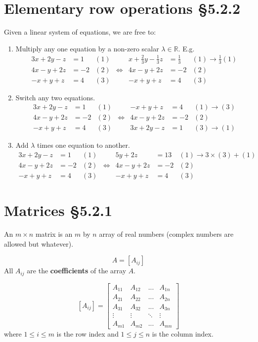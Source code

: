 \documentclass[11pt]{article}
\newcommand{\reals}{\mathbb{R}}
\begin{document}
\section{Elementary row operations §5.2.2}
Given a linear system of equations, we are free to:
\begin{enumerate}[ (1) ]
\item Multiply any one equation by a non-zero scalar $\lambda \in \reals$.
E.g.
\begin{align*}
3x + 2y - z &= 1 & (1) & & x + \frac{2}{3}y - \frac{1}{3}z &= \frac{1}{3} & (1) \rightarrow \frac{1}{3}(1) \\
4x - y + 2z &= -2 & (2) & \Leftrightarrow & 4x - y + 2z &= -2 & (2) \\
-x + y + z &= 4 & (3) & &  -x + y + z &= 4 & (3)
\end{align*}
\item Switch any two equations.
\begin{align*}
3x + 2y - z &= 1 & (1) & & -x + y + z &= 4 & (1) \rightarrow (3) \\
4x - y + 2z &= -2 & (2) & \Leftrightarrow & 4x - y + 2z &= -2 & (2) \\
-x + y + z &= 4 & (3) & &  3x + 2y - z &= 1 & (3) \rightarrow (1)
\end{align*}

\item Add $\lambda$ times one equation to another.
\begin{align*}
3x + 2y - z &= 1 & (1) & & 5y + 2z &= 13 & (1) \rightarrow 3 \times (3) + (1) \\
4x - y + 2z &= -2 & (2) & \Leftrightarrow & 4x - y + 2z &= -2 & (2) \\
-x + y + z &= 4 & (3) & &  -x + y + z &= 4 & (3)
\end{align*}

\end{enumerate}

\section{Matrices §5.2.1}
An $m \times n$ matrix is an $m$ by $n$ array of real numbers (complex numbers are allowed but whatever).

\[ A = [A_{ij}] \]
All $A_{ij}$ are the \textbf{coefficients} of the array $A$.

\[
[ A_{ij}] = 
\begin{bmatrix}
A_{11} & A_{12} & ... & A_{1n} \\
A_{21} & A_{22} & ... & A_{2n} \\
A_{31} & A_{32} & ... & A_{3n} \\
\vdots & \vdots & \ddots & \vdots \\
A_{m1} & A_{m2} & ... & A_{mn}
\end{bmatrix}
\]
where $1 \leq i \leq m$ is the row index and $1 \leq j \leq n$ is the column index.
\end{document}
